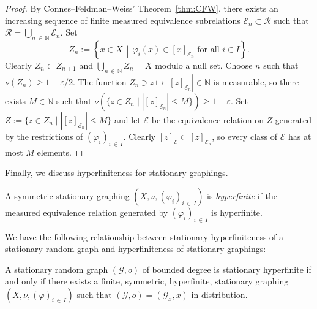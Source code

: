 \documentclass[AHL,Unicode,longabstracts,published]{cedram}
\newcommand{\bbN}{\mathbb{N}}
\newcommand{\calR}{\mathcal{R}}
\newcommand{\calE}{\mathcal{E}}
\newcommand{\calG}{\mathcal{G}}
\begin{document}
\begin{proof}
By Connes--Feldman--Weiss' Theorem~\ref{thm:CFW}, there exists an increasing sequence of finite measured equivalence subrelations $\calE_n\subset \calR$ such that $\calR=\bigcup_{n\,\in\,\bbN} \calE_n$. Set
\[
Z_n:=\left\{x\in X \,\middle|\, \varphi_i(x)\in [x]_{\calE_n} \text{ for all } i\in I\right\}.
\]
Clearly $Z_n\subset Z_{n+1}$ and $\bigcup_{n\,\in\,\bbN} Z_n=X$ modulo a null set. Choose $n$ such that $\nu(Z_n)\geq 1-\varepsilon/2$. The function $Z_n\ni z\mapsto |[z]_{\calE_n}|\in \bbN$ is measurable, so there exists $M\in\bbN$ such that $\nu(\{z\in Z_n \mid |[z]_{\calE_n}|\leq M\})\geq 1-\varepsilon$. Set $Z:=\{z\in Z_n \mid |[z]_{\calE_n}|\leq M\}$ and let $\calE$ be the equivalence relation on $Z$ generated by the restrictions of $(\varphi_i)_{i\,\in\,I}$. Clearly $[z]_{\calE}\subset [z]_{\calE_n}$, so every class of $\calE$ has at most $M$ elements.
\end{proof}

Finally, we discuss hyperfiniteness for stationary graphings.

\begin{defi}\label{dfn:StationaryHyperfinite}
A symmetric stationary graphing $(X,\nu,(\varphi_i)_{i\,\in\,I})$ is \emph{hyperfinite} if the measured equivalence relation generated by $(\varphi_i)_{i\,\in\,I}$ is hyperfinite.
\end{defi}

We have the following relationship between stationary hyperfiniteness of a stationary random graph and hyperfiniteness of stationary graphings:

\begin{lemm}\label{lem:equiv_hyperfinites}
A stationary random graph $(\calG,o)$ of bounded degree is stationary hyperfinite if and only if there exists a finite, symmetric, hyperfinite, stationary graphing $(X,\nu,(\varphi)_{i\,\in\,I})$ such that $(\calG,o)=(\calG_x,x)$ in distribution.
\end{lemm}
\end{document}

